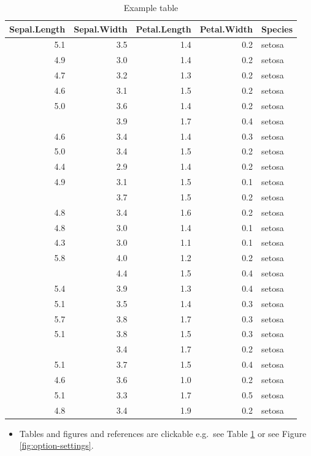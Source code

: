 \documentclass[]{book}
\providecommand{\tightlist}{%
  \setlength{\itemsep}{0pt}\setlength{\parskip}{0pt}}
\theoremstyle{definition}
\theoremstyle{definition}
\theoremstyle{definition}
\theoremstyle{remark}
\begin{document}
\begin{longtable}[t]{rrrrl}
\caption{\label{tab:nice-tab}Example table}\\
\toprule
Sepal.Length & Sepal.Width & Petal.Length & Petal.Width & Species\\
\midrule
5.1 & 3.5 & 1.4 & 0.2 & setosa\\
4.9 & 3.0 & 1.4 & 0.2 & setosa\\
4.7 & 3.2 & 1.3 & 0.2 & setosa\\
4.6 & 3.1 & 1.5 & 0.2 & setosa\\
5.0 & 3.6 & 1.4 & 0.2 & setosa\\
\addlinespace
5.4 & 3.9 & 1.7 & 0.4 & setosa\\
4.6 & 3.4 & 1.4 & 0.3 & setosa\\
5.0 & 3.4 & 1.5 & 0.2 & setosa\\
4.4 & 2.9 & 1.4 & 0.2 & setosa\\
4.9 & 3.1 & 1.5 & 0.1 & setosa\\
\addlinespace
5.4 & 3.7 & 1.5 & 0.2 & setosa\\
4.8 & 3.4 & 1.6 & 0.2 & setosa\\
4.8 & 3.0 & 1.4 & 0.1 & setosa\\
4.3 & 3.0 & 1.1 & 0.1 & setosa\\
5.8 & 4.0 & 1.2 & 0.2 & setosa\\
\addlinespace
5.7 & 4.4 & 1.5 & 0.4 & setosa\\
5.4 & 3.9 & 1.3 & 0.4 & setosa\\
5.1 & 3.5 & 1.4 & 0.3 & setosa\\
5.7 & 3.8 & 1.7 & 0.3 & setosa\\
5.1 & 3.8 & 1.5 & 0.3 & setosa\\
\addlinespace
5.4 & 3.4 & 1.7 & 0.2 & setosa\\
5.1 & 3.7 & 1.5 & 0.4 & setosa\\
4.6 & 3.6 & 1.0 & 0.2 & setosa\\
5.1 & 3.3 & 1.7 & 0.5 & setosa\\
4.8 & 3.4 & 1.9 & 0.2 & setosa\\
\bottomrule
\end{longtable}

\begin{itemize}
\tightlist
\item
  Tables and figures and references are clickable e.g.~see Table
  \ref{tab:nice-tab} or see Figure \ref{fig:option-settings}.
\end{itemize}
\end{document}
